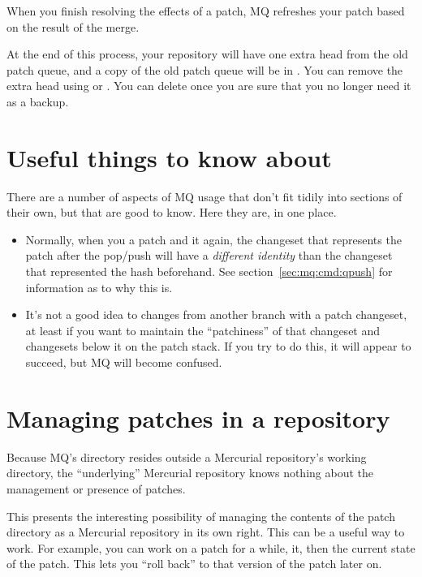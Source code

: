 When you finish resolving the effects of a patch, MQ refreshes your
patch based on the result of the merge.

At the end of this process, your repository will have one extra head
from the old patch queue, and a copy of the old patch queue will be in
. You can remove the extra head using
or .  You can delete  once
you are sure that you no longer need it as a backup.

\section{Useful things to know about}

There are a number of aspects of MQ usage that don't fit tidily into
sections of their own, but that are good to know.  Here they are, in
one place.

\begin{itemize}
\item Normally, when you  a patch and  it
  again, the changeset that represents the patch after the pop/push
  will have a \emph{different identity} than the changeset that
  represented the hash beforehand.  See section~\ref{sec:mq:cmd:qpush}
  for information as to why this is.
\item It's not a good idea to  changes from another
  branch with a patch changeset, at least if you want to maintain the
  ``patchiness'' of that changeset and changesets below it on the
  patch stack.  If you try to do this, it will appear to succeed, but
  MQ will become confused.
\end{itemize}
\section{Managing patches in a repository}

Because MQ's  directory resides outside a
Mercurial repository's working directory, the ``underlying'' Mercurial
repository knows nothing about the management or presence of patches.

This presents the interesting possibility of managing the contents of
the patch directory as a Mercurial repository in its own right.  This
can be a useful way to work.  For example, you can work on a patch for
a while,  it, then  the current state of
the patch.  This lets you ``roll back'' to that version of the patch
later on.

